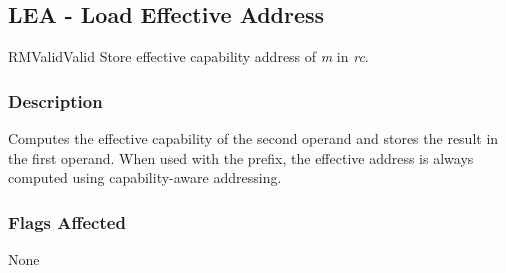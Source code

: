 \clearpage
{}
{}
\subsection*{LEA - Load Effective Address}

\begin{x86opcodetable}
  {RM}{Valid}{Valid}
  {Store effective capability address of \emph{m} in \emph{rc}.}
\end{x86opcodetable}

\begin{x86opentable}
\end{x86opentable}

\subsubsection*{Description}

Computes the effective capability of the second operand and stores the
result in the first operand.  When used with the 
prefix, the effective address is always computed using
capability-aware addressing.

\subsubsection*{Flags Affected}

None
